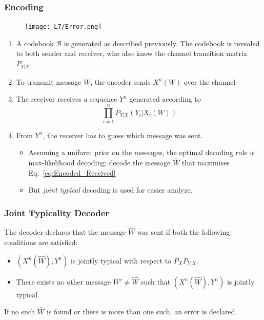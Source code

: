 \documentclass[12pt]{article}
\begin{document}
\subsubsection{Encoding}\begin{figure}[H]
    \centering
    \texttt{[image: L7/Error.png]}
\end{figure}
\begin{enumerate}
    \item A codebook $\mathcal{B}$ is generated as described previously. The codebook is revealed to both sender and receiver, who also know the channel transition matrix $P_{Y|X}$.
    \item To transmit message $W$, the encoder sends $X^n(W)$ over the channel 
    \item The receiver receives a sequence $Y^n$ generated according to 
    \begin{equation}
        \prod_{i=1}^n P_{Y|X}(Y_i|X_i(W))
        \label{eq:Encoded_Received}
    \end{equation}
    \item From $Y^n$, the receiver has to guess which message was sent.
    \begin{itemize}
        \item Assuming a uniform prior on the messages, the optimal decoding rule is max-likelihood decoding: decode the message $\hat{W}$ that maximises Eq.~\ref{eq:Encoded_Received}
        \item But \textit{\textcolor{blue1}{joint typical }}decoding is used for easier analyze.
    \end{itemize}
\end{enumerate}
\subsubsection{Joint Typicality Decoder}
The decoder declares that the message $\hat{W}$ was sent if both the following conditions are satisfied:
\begin{itemize}
    \item $(X^n(\hat{W}), Y^n)$ is jointly typical with respect to $P_X P_{Y|X}$.
    \item There exists no other message $W\prime \not = \hat{W}$ such that  $(X^n(\hat{W}), Y^n)$ is jointly typical.
\end{itemize}
If no such $\hat{W}$ is found or there is more than one such, an error is declared.
\end{document}
